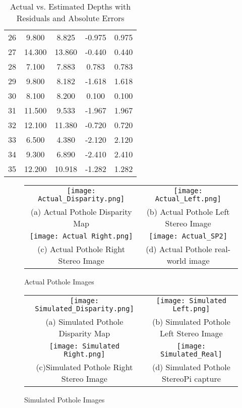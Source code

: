 \begin{table}[h!]
{\begin{tabular}{|c|c|c|c|c|}
			26 & 9.800 & 8.825 & -0.975 & 0.975 \\
			27 & 14.300 & 13.860 & -0.440 & 0.440 \\
			28 & 7.100 & 7.883 & 0.783 & 0.783 \\
			29 & 9.800 & 8.182 & -1.618 & 1.618 \\
			30 & 8.100 & 8.200 & 0.100 & 0.100 \\
			31 & 11.500 & 9.533 & -1.967 & 1.967 \\
			32 & 12.100 & 11.380 & -0.720 & 0.720 \\
			33 & 6.500 & 4.380 & -2.120 & 2.120 \\
			34 & 9.300 & 6.890 & -2.410 & 2.410 \\
			35 & 12.200 & 10.918 & -1.282 & 1.282 \\
			
			\hline
		\end{tabular}
	}
	\caption{Actual vs. Estimated Depths with Residuals and Absolute Errors}
	\label{tab:depth_results}
\end{table}

\begin{figure}
	\begin{tabular}{cc}
		\texttt{[image: Actual\_Disparity.png]} &   \texttt{[image: Actual\_Left.png]} \\
		(a) Actual Pothole Disparity Map & (b) Actual Pothole Left Stereo Image \\[6pt]
		\texttt{[image: Actual Right.png]} & \texttt{[image: Actual\_SP2]} \\
		(c)  Actual Pothole Right Stereo Image & (d)  Actual Pothole real-world image \\[6pt]
	\end{tabular}
	\caption{Actual Pothole Images }
\end{figure}

\begin{figure}[htbp]
	\begin{tabular}{cc}
		\texttt{[image: Simulated\_Disparity.png]} &   \texttt{[image: Simulated Left.png]} \\
		(a) Simulated Pothole Disparity Map & (b) Simulated Pothole Left Stereo Image \\[6pt]
		\texttt{[image: Simulated Right.png]} &   \texttt{[image: Simulated\_Real]} \\
		(c)Simulated Pothole Right Stereo Image & (d)  Simulated Pothole StereoPi capture \\[6pt]
	\end{tabular}
	\caption{Simulated Pothole Images }
\end{figure}

